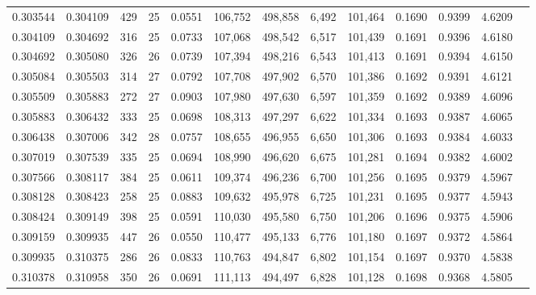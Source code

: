 \begin{tabular}{rrrrrrrrrrrrr}
0.303544 & 0.304109 & 429 &  25 &                                     0.0551 & 106,752 & 498,858 &   6,492 & 101,464 & 0.1690 & 0.9399 & 4.6209 \\
0.304109 & 0.304692 & 316 &  25 &                                     0.0733 & 107,068 & 498,542 &   6,517 & 101,439 & 0.1691 & 0.9396 & 4.6180 \\
0.304692 & 0.305080 & 326 &  26 &                                     0.0739 & 107,394 & 498,216 &   6,543 & 101,413 & 0.1691 & 0.9394 & 4.6150 \\
0.305084 & 0.305503 & 314 &  27 &                                     0.0792 & 107,708 & 497,902 &   6,570 & 101,386 & 0.1692 & 0.9391 & 4.6121 \\
0.305509 & 0.305883 & 272 &  27 &                                     0.0903 & 107,980 & 497,630 &   6,597 & 101,359 & 0.1692 & 0.9389 & 4.6096 \\
0.305883 & 0.306432 & 333 &  25 &                                     0.0698 & 108,313 & 497,297 &   6,622 & 101,334 & 0.1693 & 0.9387 & 4.6065 \\
0.306438 & 0.307006 & 342 &  28 &                                     0.0757 & 108,655 & 496,955 &   6,650 & 101,306 & 0.1693 & 0.9384 & 4.6033 \\
0.307019 & 0.307539 & 335 &  25 &                                     0.0694 & 108,990 & 496,620 &   6,675 & 101,281 & 0.1694 & 0.9382 & 4.6002 \\
0.307566 & 0.308117 & 384 &  25 &                                     0.0611 & 109,374 & 496,236 &   6,700 & 101,256 & 0.1695 & 0.9379 & 4.5967 \\
0.308128 & 0.308423 & 258 &  25 &                                     0.0883 & 109,632 & 495,978 &   6,725 & 101,231 & 0.1695 & 0.9377 & 4.5943 \\
0.308424 & 0.309149 & 398 &  25 &                                     0.0591 & 110,030 & 495,580 &   6,750 & 101,206 & 0.1696 & 0.9375 & 4.5906 \\
0.309159 & 0.309935 & 447 &  26 &                                     0.0550 & 110,477 & 495,133 &   6,776 & 101,180 & 0.1697 & 0.9372 & 4.5864 \\
0.309935 & 0.310375 & 286 &  26 &                                     0.0833 & 110,763 & 494,847 &   6,802 & 101,154 & 0.1697 & 0.9370 & 4.5838 \\
0.310378 & 0.310958 & 350 &  26 &                                     0.0691 & 111,113 & 494,497 &   6,828 & 101,128 & 0.1698 & 0.9368 & 4.5805 \\

\end{tabular}
